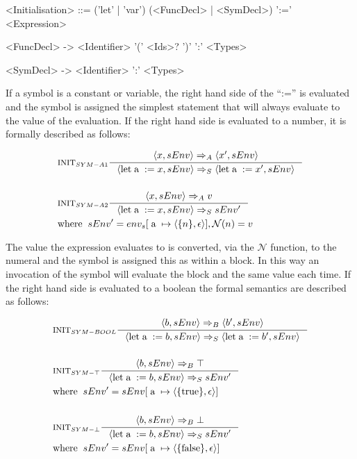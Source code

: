 \begin{grammar}
<Initialisation> ::= ('let' | 'var') (<FuncDecl> | <SymDecl>) ':=' <Expression>

<FuncDecl> -> <Identifier> '(' <Ids>? ')' ':' <Types>

<SymDecl> -> <Identifier> ':' <Types>
\end{grammar}

If a symbol is a constant or variable, the right hand side of the \enquote{:=} is evaluated and the symbol is assigned the simplest statement that will always evaluate to the value of the evaluation. If the right hand side is evaluated to a number, it is formally described as follows:

\begin{align*}
&\inference[$\text{INIT}_{SYM-A1}$]{\Braket{x,sEnv} \Rightarrow_A \Braket{x',sEnv}}
                         {\Braket{\Tlet \Ta := x,sEnv} \Rightarrow_S \Braket{\Tlet \Ta := x',sEnv}}
\\\\
&\inference[$\text{INIT}_{SYM-A2}$]{\Braket{x,sEnv} \Rightarrow_A v}
                         {\Braket{\Tlet \Ta := x,sEnv} \Rightarrow_S sEnv'}
\\
&{\Twhere sEnv' = env_{s}[\Ta \mapsto \Braket{\{n\},\epsilon}], \mathcal{N}(n) = v}
\end{align*}

The value the expression evaluates to is converted, via the $\mathcal{N}$ function, to the numeral and the symbol is assigned this as within a block. In this way an invocation of the symbol will evaluate the block and the same value each time. If the right hand side is evaluated to a boolean the formal semantics are described as follows:

\begin{align*}
&\inference[$\text{INIT}_{SYM-BOOL}$]{\Braket{b,sEnv} \Rightarrow_B \Braket{b',sEnv}}
                         {\Braket{\Tlet \Ta := b,sEnv} \Rightarrow_S \Braket{\Tlet \Ta := b',sEnv}}
\\\\
&\inference[$\text{INIT}_{SYM-\top}$]{\Braket{b,sEnv} \Rightarrow_B \top}
                         {\Braket{\Tlet \Ta := b,sEnv} \Rightarrow_S sEnv'}
\\
&{\Twhere sEnv' = sEnv[\Ta \mapsto \Braket{\{\Ttrue\},\epsilon}]}
\\\\
&\inference[$\text{INIT}_{SYM-\bot}$]{\Braket{b,sEnv} \Rightarrow_B \bot}
                         {\Braket{\Tlet \Ta := b,sEnv} \Rightarrow_S sEnv'}
\\
&{\Twhere sEnv' = sEnv[\Ta \mapsto \Braket{\{\Tfalse\},\epsilon}]}
\end{align*}

